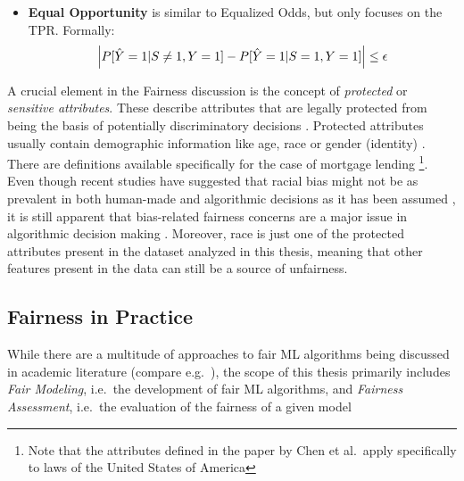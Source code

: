 \begin{itemize}
    \item \textbf{Equal Opportunity} is similar to Equalized Odds, but only focuses on the TPR. Formally:
    \begin{equation}
    \left| P[\hat{Y} = 1|S \neq 1, Y = 1] - P[\hat{Y} = 1|S = 1, Y = 1] \right| \leq \epsilon
    \label{eq:equal_opportunity}
    \addcontentsline{frm}{formulas}{\protect\numberline{\theequation}\hspace{1em}Equal Opportunity}
    \end{equation}
\end{itemize}

A crucial element in the Fairness discussion is the concept of \textit{protected} or \textit{sensitive attributes}. These describe attributes that are legally protected from being the basis of potentially discriminatory decisions \parencite{Datta2017}.
Protected attributes usually contain demographic information like age, race or gender (identity) \parencite{Teodorescu2020}. There are definitions available specifically for the case of mortgage lending \parencite{Chen2019}\footnote{Note that the attributes defined in the paper by Chen et al.\ apply specifically to laws of the United States of America}. 
Even though recent studies have suggested that racial bias might not be as prevalent in both human-made and algorithmic decisions as it has been assumed \parencite{Bhutta2022}, 
it is still apparent that bias-related fairness concerns are a major issue in algorithmic decision making \parencite{Mehrabi2021}.
Moreover, race is just one of the protected attributes present in the dataset analyzed in this thesis, meaning that other features present in the data can still be a source of unfairness.

\subsection{Fairness in Practice}\label{subsec:practice}

While there are a multitude of approaches to fair ML algorithms being discussed in academic literature (compare e.g.\ \cite{Mehrabi2021}), the scope of this thesis primarily includes \textit{Fair Modeling}, i.e.\ the development of fair ML algorithms, and \textit{Fairness Assessment}, i.e.\ the evaluation of the fairness of a given model



